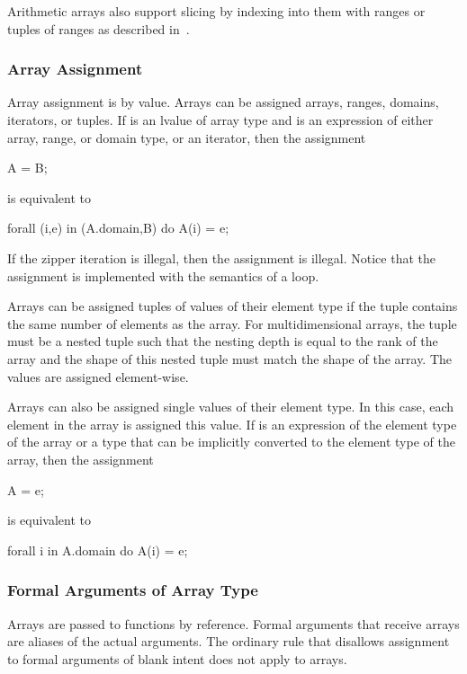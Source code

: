 Arithmetic arrays also support slicing by indexing into them with
ranges or tuples of ranges as described
in~.

\subsubsection{Array Assignment}
\label{Array_Assignment}

Array assignment is by value.  Arrays can be assigned arrays, ranges,
domains, iterators, or tuples.  If  is an lvalue of array type
and  is an expression of either array, range, or domain type,
or an iterator, then the assignment
\begin{chapel}
A = B;
\end{chapel}
is equivalent to
\begin{chapel}
forall (i,e) in (A.domain,B) do
  A(i) = e;
\end{chapel}
If the zipper iteration is illegal, then the assignment is illegal.
Notice that the assignment is implemented with the semantics of
a  loop.

Arrays can be assigned tuples of values of their element type if the
tuple contains the same number of elements as the array.  For
multidimensional arrays, the tuple must be a nested tuple such that
the nesting depth is equal to the rank of the array and the shape of
this nested tuple must match the shape of the array.  The values are
assigned element-wise.

Arrays can also be assigned single values of their element type.  In
this case, each element in the array is assigned this value.
If  is an expression of the element type of the array or a
type that can be implicitly converted to the element type of the
array, then the assignment
\begin{chapel}
A = e;
\end{chapel}
is equivalent to
\begin{chapel}
forall i in A.domain do
  A(i) = e;
\end{chapel}

\subsubsection{Formal Arguments of Array Type}
\label{Formal_Arguments_of_Array_Type}

Arrays are passed to functions by reference.  Formal arguments that
receive arrays are aliases of the actual arguments.  The ordinary rule
that disallows assignment to formal arguments of blank intent does not
apply to arrays.

